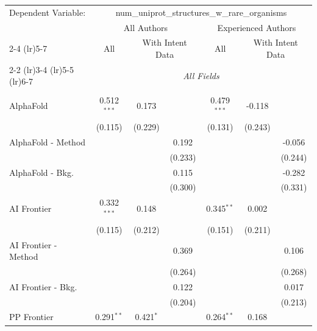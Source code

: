 \begingroup
\centering
\begin{tabular}{lcccccc}
   \tabularnewline \midrule \midrule
   Dependent Variable: & \multicolumn{6}{c}{num\_uniprot\_structures\_w\_rare\_organisms}\\
 & \multicolumn{3}{c}{All Authors} & \multicolumn{3}{c}{Experienced Authors} \\
\cmidrule(lr){2-4} \cmidrule(lr){5-7}
 & \multicolumn{1}{c}{All} & \multicolumn{2}{c}{With Intent Data} & \multicolumn{1}{c}{All} & \multicolumn{2}{c}{With Intent Data} \\
\cmidrule(lr){2-2} \cmidrule(lr){3-4} \cmidrule(lr){5-5} \cmidrule(lr){6-7}
 & \multicolumn{6}{c}{\textit{All Fields}} \\ \\
   AlphaFold            & 0.512$^{***}$ & 0.173       &              & 0.479$^{***}$ & -0.118  &   \\   
                        & (0.115)       & (0.229)     &              & (0.131)       & (0.243) &   \\   
   AlphaFold - Method   &               &             & 0.192        &               &         & -0.056\\   
                        &               &             & (0.233)      &               &         & (0.244)\\   
   AlphaFold - Bkg.     &               &             & 0.115        &               &         & -0.282\\   
                        &               &             & (0.300)      &               &         & (0.331)\\   
   AI Frontier          & 0.332$^{***}$ & 0.148       &              & 0.345$^{**}$  & 0.002   &   \\   
                        & (0.115)       & (0.212)     &              & (0.151)       & (0.211) &   \\   
   AI Frontier - Method &               &             & 0.369        &               &         & 0.106\\   
                        &               &             & (0.264)      &               &         & (0.268)\\   
   AI Frontier - Bkg.   &               &             & 0.122        &               &         & 0.017\\   
                        &               &             & (0.204)      &               &         & (0.213)\\   
   PP Frontier          & 0.291$^{**}$  & 0.421$^{*}$ &              & 0.264$^{**}$  & 0.168   &   \\   

\end{tabular}
